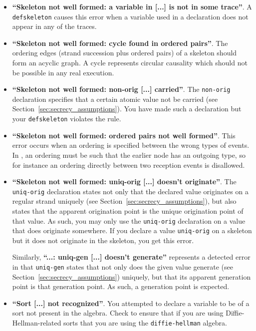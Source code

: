 \begin{itemize}
\item \textbf{``Skeleton not well formed: a variable in [...] is not in some trace''}.
  A \texttt{defskeleton} causes this error when a variable used in a declaration
  does not appear in any of the traces.

\item \textbf{``Skeleton not well formed: cycle found in ordered pairs''}.
  The ordering edges (strand succession plus ordered pairs) of a skeleton should form
  an acyclic graph.  A cycle represents circular causality which should not be possible in
  any real execution.

\item \textbf{``Skeleton not well formed: non-orig [...] carried''}.  The \texttt{non-orig}
  declaration specifies that a certain atomic value not be carried
  (see Section~\ref{sec:secrecy_assumptions}).  You have made such a declaration but your
  \texttt{defskeleton} violates the rule.

\item \textbf{``Skeleton not well formed: ordered pairs not well formed''}.
  This error occurs when an ordering is specified between the wrong types of events.
  In {\cpsa}, an ordering must be such that the earlier node has an outgoing type, so
  for instance an ordering directly between two reception events is disallowed.

  \item \textbf{``Skeleton not well formed: uniq-orig [...] doesn't
    originate''}.  The \texttt{uniq-orig} declaration states not only
  that the declared value originates on a regular strand uniquely (see
  Section~\ref{sec:secrecy_assumptions}), but also states that the
  apparent origination point is the unique origination point of that
  value.  As such, you may only use the \texttt{uniq-orig} declaration
  on a value that does originate somewhere.  If you declare a value
  \texttt{uniq-orig} on a skeleton but it does not originate in the
  skeleton, you get this error.

  Similarly, \textbf{``...: uniq-gen [...] doesn't generate''}
  represents a detected error in that \texttt{uniq-gen} states that
  not only does the given value generate (see
  Section~\ref{sec:secrecy_assumptions}) uniquely, but that its apparent
  generation point is that generation point.  As such, a generation
  point is expected.

\item \textbf{``Sort [...] not recognized''}.  You attempted to declare a variable
  to be of a sort not present in the algebra.  Check to ensure that if you are using
  Diffie-Hellman-related sorts that you are using the \texttt{diffie-hellman} algebra.


\end{itemize}
